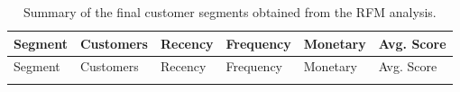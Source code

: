 \documentclass[
  12pt,
  letterpaper,
]{book}
\begin{document}
\begin{longtable}[]{@{}
  >{\centering\arraybackslash}p{}
  >{\centering\arraybackslash}p{}
  >{\centering\arraybackslash}p{}
  >{\centering\arraybackslash}p{}
  >{\centering\arraybackslash}p{}
  >{\centering\arraybackslash}p{}@{}}
\caption{Summary of the final customer segments obtained from the RFM
analysis.}\label{tbl-segment-summary}\tabularnewline
\toprule\noalign{}
\begin{minipage}[b]{\linewidth}\centering
Segment
\end{minipage} & \begin{minipage}[b]{\linewidth}\centering
Customers
\end{minipage} & \begin{minipage}[b]{\linewidth}\centering
Recency
\end{minipage} & \begin{minipage}[b]{\linewidth}\centering
Frequency
\end{minipage} & \begin{minipage}[b]{\linewidth}\centering
Monetary
\end{minipage} & \begin{minipage}[b]{\linewidth}\centering
Avg. Score
\end{minipage} \\
\midrule\noalign{}
\endfirsthead
\toprule\noalign{}
\begin{minipage}[b]{\linewidth}\centering
Segment
\end{minipage} & \begin{minipage}[b]{\linewidth}\centering
Customers
\end{minipage} & \begin{minipage}[b]{\linewidth}\centering
Recency
\end{minipage} & \begin{minipage}[b]{\linewidth}\centering
Frequency
\end{minipage} & \begin{minipage}[b]{\linewidth}\centering
Monetary
\end{minipage} & \begin{minipage}[b]{\linewidth}\centering
Avg. Score
\end{minipage} \\
\midrule\noalign{}

\end{longtable}
\end{document}
